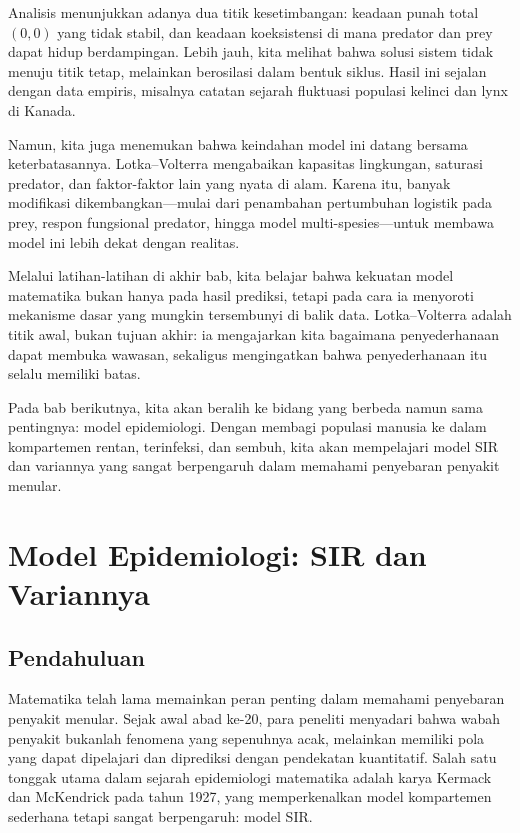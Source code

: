 \documentclass{bukumjh}
\begin{document}
Analisis menunjukkan adanya dua titik kesetimbangan: keadaan punah total $(0,0)$ yang tidak stabil, dan keadaan koeksistensi di mana predator dan prey dapat hidup berdampingan. Lebih jauh, kita melihat bahwa solusi sistem tidak menuju titik tetap, melainkan berosilasi dalam bentuk siklus. Hasil ini sejalan dengan data empiris, misalnya catatan sejarah fluktuasi populasi kelinci dan lynx di Kanada.

Namun, kita juga menemukan bahwa keindahan model ini datang bersama keterbatasannya. Lotka–Volterra mengabaikan kapasitas lingkungan, saturasi predator, dan faktor-faktor lain yang nyata di alam. Karena itu, banyak modifikasi dikembangkan—mulai dari penambahan pertumbuhan logistik pada prey, respon fungsional predator, hingga model multi-spesies—untuk membawa model ini lebih dekat dengan realitas.

Melalui latihan-latihan di akhir bab, kita belajar bahwa kekuatan model matematika bukan hanya pada hasil prediksi, tetapi pada cara ia menyoroti mekanisme dasar yang mungkin tersembunyi di balik data. Lotka–Volterra adalah titik awal, bukan tujuan akhir: ia mengajarkan kita bagaimana penyederhanaan dapat membuka wawasan, sekaligus mengingatkan bahwa penyederhanaan itu selalu memiliki batas.

Pada bab berikutnya, kita akan beralih ke bidang yang berbeda namun sama pentingnya: {\jsg model epidemiologi}. Dengan membagi populasi manusia ke dalam kompartemen rentan, terinfeksi, dan sembuh, kita akan mempelajari model SIR dan variannya yang sangat berpengaruh dalam memahami penyebaran penyakit menular.


\chapter{Model Epidemiologi: SIR dan Variannya}

\section{Pendahuluan}

Matematika telah lama memainkan peran penting dalam memahami penyebaran penyakit menular. Sejak awal abad ke-20, para peneliti menyadari bahwa wabah penyakit bukanlah fenomena yang sepenuhnya acak, melainkan memiliki pola yang dapat dipelajari dan diprediksi dengan pendekatan kuantitatif. Salah satu tonggak utama dalam sejarah epidemiologi matematika adalah karya Kermack dan McKendrick pada tahun 1927, yang memperkenalkan model kompartemen sederhana tetapi sangat berpengaruh: {\jsg model SIR}.
\end{document}
